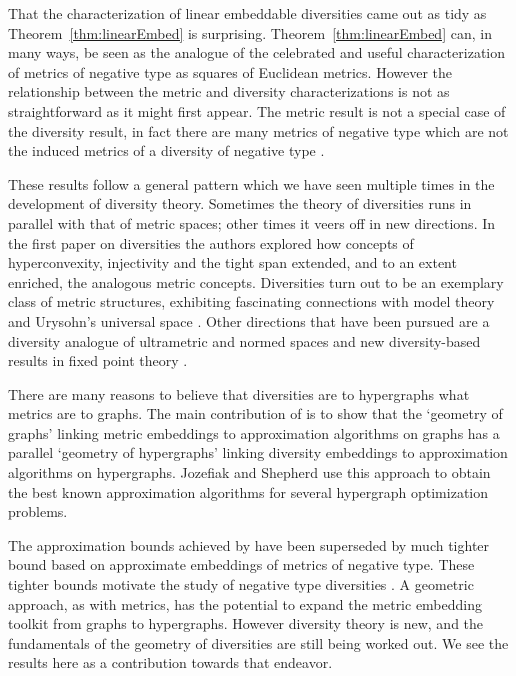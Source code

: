 \documentclass[11pt]{article}
\begin{document}
That the characterization of linear embeddable diversities came out as tidy as Theorem~\ref{thm:linearEmbed} is surprising. Theorem~\ref{thm:linearEmbed} can, in many ways, be seen as the analogue of the celebrated and useful characterization of  metrics of negative type as squares of Euclidean metrics. However the relationship between the metric and diversity  characterizations is not as straightforward as it might first appear. The metric result is not  a special case of the diversity result, in fact there are many metrics of negative type which are not the induced metrics of a diversity of negative type \cite{WuBryantEtal19}. 

These results follow a general pattern which we have seen multiple times in the development of diversity theory. Sometimes the theory of diversities  runs  in parallel with that of metric spaces; other times it veers off in new directions. In the first paper on diversities \cite{BryantTupper12} the authors explored how concepts of hyperconvexity, injectivity and the tight span extended, and to an extent enriched, the analogous metric concepts.  
Diversities turn out to be an exemplary class of metric structures, exhibiting fascinating connections with model theory and Urysohn's universal space \cite{BryantNiesEtal17,BryantNiesEtal21,Hallback20,hallback2020automorphism}. Other directions that have been pursued are a diversity analogue of ultrametric and normed spaces \cite{HaghmaramNourouzi20,MehrabaniNourouzi20,haghmaram2022diversity} and new diversity-based results in fixed point theory \cite{espinola2014diversities,Piatek14}.

There are many reasons to believe that diversities are to hypergraphs what metrics are to graphs. The main contribution of  \cite{BryantTupper14} is to show that the `geometry of graphs' linking metric embeddings to approximation algorithms on graphs  \cite{LinialLondonEtal95}  has a parallel `geometry of hypergraphs' linking diversity embeddings to approximation algorithms on hypergraphs. Jozefiak and Shepherd \cite{jozefiak2023diversity} use this approach to obtain the best known approximation algorithms for several hypergraph optimization problems. 

The approximation bounds achieved by \cite{LinialLondonEtal95} have  been superseded by much tighter bound based on  approximate embeddings of metrics of negative type. These tighter bounds motivate the study of negative type diversities \cite{WuBryantEtal19}. A geometric approach, as with metrics, has the potential to expand the metric embedding toolkit from graphs to hypergraphs. However diversity theory is new, and the fundamentals of the geometry of diversities are still being worked out. We see the results here as a contribution towards that endeavor. \\
\end{document}
